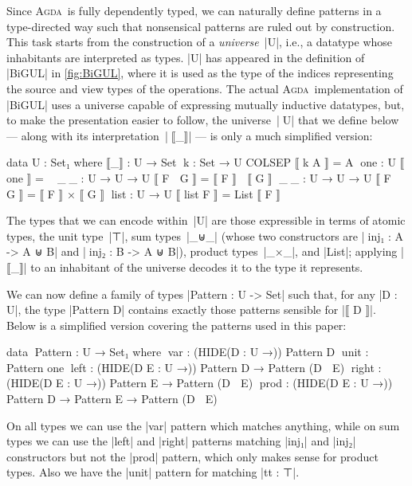 \documentclass{sigplanconf}
\newcommand{\ucomma}{\kern1pt, }
\renewcommand{\emph}{\textsl}
\newcommand{\Agda}{\textsc{Agda}}
\begin{document}
Since \Agda\ is fully dependently typed, we can naturally define patterns in a type-directed way such that nonsensical patterns are ruled out by construction.
This task starts from the construction of a \emph{universe}~|U|, i.e., a datatype whose inhabitants are interpreted as types.
|U| has appeared in the definition of |BiGUL| in \autoref{fig:BiGUL}, where it is used as the type of the indices representing the source and view types of the operations.
The actual \Agda\ implementation of |BiGUL| uses a universe capable of expressing mutually inductive datatypes, but, to make the presentation easier to follow, the universe~|^^^U| that we define below --- along with its interpretation~|^^^⟦_⟧| --- is only a much simplified version:
\begin{code}
data U : Set₁ where             ⟦_⟧ : U → Set
  ^^^k     : Set → U    COLSEP  ⟦ k A     ⟧ = A
  ^^^one   : U                  ⟦ one     ⟧ = ⊤
  ^^^_⊕_   : U → U → U          ⟦ F ⊕ G   ⟧ = ⟦ F ⟧  ⊎  ⟦ G ⟧
  ^^^_⊗_   : U → U → U          ⟦ F ⊗ G   ⟧ = ⟦ F ⟧  ×  ⟦ G ⟧
  ^^^list  : U → U              ⟦ list F  ⟧ = List ⟦ F ⟧
\end{code}
The types that we can encode within~|U| are those expressible in terms of atomic types, the unit type~|⊤|, sum types~|_⊎_| (whose two constructors are |^^^inj₁ : A -> A ⊎ B| and |^^^inj₂ : B -> A ⊎ B|), product types~|_×_|\ucomma and |List|; applying |⟦_⟧| to an inhabitant of the universe decodes it to the type it represents.

We can now define a family of types |Pattern : U -> Set| such that, for any |D : U|, the type |Pattern D| contains exactly those patterns sensible for |⟦ D ⟧|.
Below is a simplified version covering the patterns used in this paper:
\begin{code}
data ^^^Pattern : U → Set₁ where
  ^^^var    : (HIDE({D : U} →)) Pattern D
  ^^^unit   : Pattern one
  ^^^left   : (HIDE({D E : U} →)) Pattern D → Pattern (D ⊕ E)
  ^^^right  : (HIDE({D E : U} →)) Pattern E → Pattern (D ⊕ E)
  ^^^prod   : (HIDE({D E : U} →)) Pattern D → Pattern E → Pattern (D ⊗ E)
\end{code}
On all types we can use the |var| pattern which matches anything, while on sum types we can use the |left| and |right| patterns matching |inj₁| and |inj₂| constructors but not the |prod| pattern, which only makes sense for product types.
Also we have the |unit| pattern for matching |tt : ⊤|.
\end{document}
